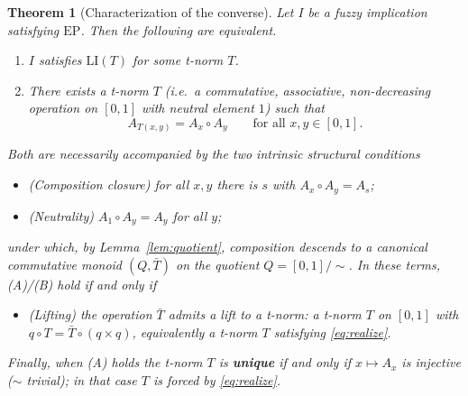 \documentclass{amsart}
\newtheorem{theorem}{Theorem}
\theoremstyle{definition}
\theoremstyle{remark}
\newcommand{\zo}{[0,1]}
\newcommand{\LI}{\mathrm{LI}}
\newcommand{\EP}{\mathrm{EP}}
\newcommand{\Ax}{A}
\begin{document}
\begin{theorem}[Characterization of the converse]\label{thm:b-char}
Let $I$ be a fuzzy implication satisfying $\EP$. Then the following are equivalent.
\begin{enumerate}
\item[\textnormal{(A)}] $I$ satisfies $\LI(T)$ for some t-norm $T$.
\item[\textnormal{(B)}] There exists a t-norm $T$ (i.e.\ a commutative, associative,
non-decreasing operation on $\zo$ with neutral element $1$) such that
\begin{equation}\label{eq:realize}
\Ax_{T(x,y)}=\Ax_x\circ\Ax_y\qquad\text{for all }x,y\in\zo .
\end{equation}
\end{enumerate}
Both are \emph{necessarily} accompanied by the two intrinsic structural conditions
\begin{itemize}
\item[\textnormal{(C1)}] \emph{(Composition closure)} for all $x,y$ there is $s$ with
$\Ax_x\circ\Ax_y=\Ax_s$;
\item[\textnormal{(C2)}] \emph{(Neutrality)} $\Ax_1\circ\Ax_y=\Ax_y$ for all $y$;
\end{itemize}
under which, by Lemma~\ref{lem:quotient}, composition descends to a canonical commutative
monoid $(Q,\bar T)$ on the quotient $Q=\zo/\!\sim$. In these terms, \textnormal{(A)}/(B)
hold if and only if
\begin{itemize}
\item[\textnormal{(L)}] \emph{(Lifting)} the operation $\bar T$ admits a \emph{lift to a
t-norm}: a t-norm $T$ on $\zo$ with $q\circ T=\bar T\circ(q\times q)$, equivalently a t-norm
$T$ satisfying \eqref{eq:realize}.
\end{itemize}
Finally, when \textnormal{(A)} holds the t-norm $T$ is \textbf{unique} if and only if
$x\mapsto\Ax_x$ is injective ($\sim$ trivial); in that case $T$ is forced by
\eqref{eq:realize}.
\end{theorem}
\end{document}
